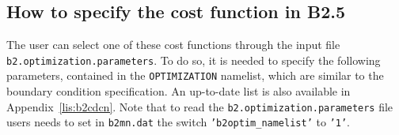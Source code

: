 \subsection{How to specify the cost function in B2.5}

The user can select one of these cost functions through the input file {\tt b2.optimization.parameters}. To do so, it is needed to specify the following parameters, contained in the {\tt OPTIMIZATION} namelist, which are similar to the boundary condition specification. An up-to-date list is also available in Appendix~\ref{lis:b2cdcn}. Note that to read the {\tt b2.optimization.parameters} file users needs to set in {\tt b2mn.dat} the switch {\tt 'b2optim\_namelist'} to {\tt '1'}. 
